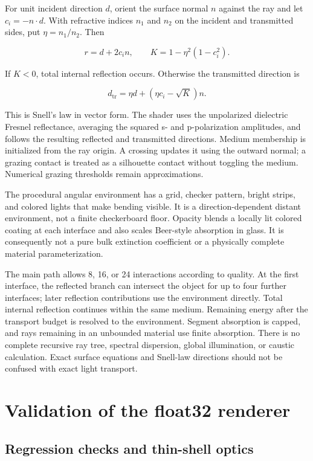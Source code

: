 \documentclass[11pt,a4paper]{article}
\begin{document}
For unit incident direction \(d\), orient the surface normal \(n\)
against the ray and let \(c_i=-n\cdot d\). With refractive indices
\(n_1\) and \(n_2\) on the incident and transmitted sides, put
\(\eta=n_1/n_2\). Then

\[
r=d+2c_i n,\qquad K=1-\eta^2(1-c_i^2).
\]

If \(K<0\), total internal reflection occurs. Otherwise the transmitted
direction is

\[
d_{\mathrm{tr}}=\eta d+(\eta c_i-\sqrt K)n.
\]

This is Snell's law in vector form. The shader uses the unpolarized
dielectric Fresnel reflectance, averaging the squared s- and
p-polarization amplitudes, and follows the resulting reflected and
transmitted directions. Medium membership is initialized from the ray
origin. A crossing updates it using the outward normal; a grazing
contact is treated as a silhouette contact without toggling the medium.
Numerical grazing thresholds remain approximations.

The procedural angular environment has a grid, checker pattern, bright
strips, and colored lights that make bending visible. It is a
direction-dependent distant environment, not a finite checkerboard
floor. Opacity blends a locally lit colored coating at each interface
and also scales Beer-style absorption in glass. It is consequently not a
pure bulk extinction coefficient or a physically complete material
parameterization.

The main path allows 8, 16, or 24 interactions according to quality. At
the first interface, the reflected branch can intersect the object for
up to four further interfaces; later reflection contributions use the
environment directly. Total internal reflection continues within the
same medium. Remaining energy after the transport budget is resolved to
the environment. Segment absorption is capped, and rays remaining in an
unbounded material use finite absorption. There is no complete recursive
ray tree, spectral dispersion, global illumination, or caustic
calculation. Exact surface equations and Snell-law directions should not
be confused with exact light transport.

\section{Validation of the float32
renderer}\label{validation-of-the-float32-renderer}

\subsection{Regression checks and thin-shell
optics}\label{regression-checks-and-thin-shell-optics}
\end{document}

